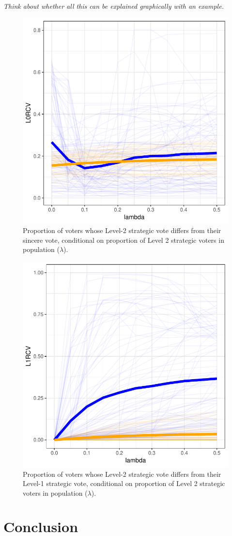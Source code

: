 \documentclass[11pt, letter]{article}
\begin{document}
\emph{Think about whether all this can be explained graphically with an example.}

\begin{figure}[!h]
	\centering
	\includegraphics[width = .6 \textwidth]{"../output/figures/cses_l0"}
	\caption{Proportion of voters whose Level-2 strategic vote differs from their sincere vote, conditional on proportion of Level 2 strategic voters in population ($\lambda$). }
	\label{fig:interdep_l0}
\end{figure}

\begin{figure}[!h]
	\centering
	\includegraphics[width = .6 \textwidth]{"../output/figures/cses_l1"}
	\caption{Proportion of voters whose Level-2 strategic vote differs from their Level-1 strategic vote, conditional on proportion of Level 2 strategic voters in population ($\lambda$). }
	\label{fig:interdep_l1}
\end{figure}

\section{Conclusion}
\end{document}
